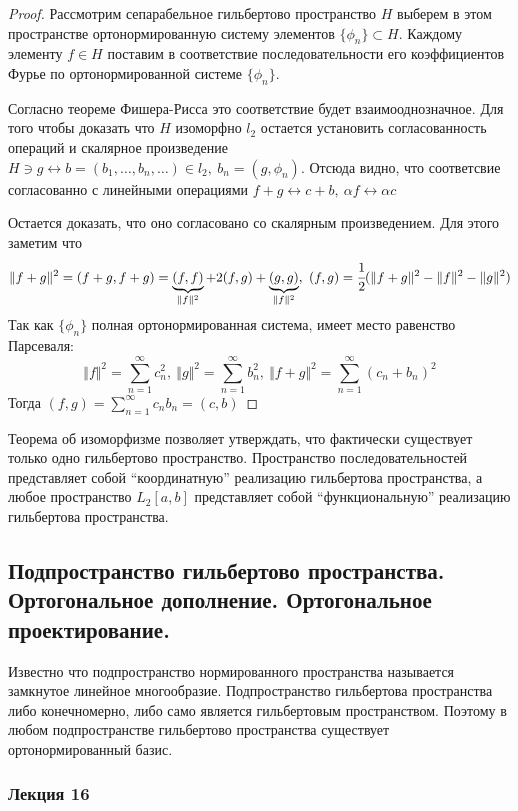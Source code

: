 \documentclass[14pt]{extarticle}
\theoremstyle{definition}
\theoremstyle{remark}
\renewcommand{\[}{\begin{dmath*}[compact]}
\renewcommand{\]}{\end{dmath*}}
\newcommand{\sep}{ , \ \allowbreak }
\begin{document}
\begin{proof}
  Рассмотрим сепарабельное гильбертово пространство $H$ выберем в этом
  пространстве ортонормированную систему элементов $\{\phi_n\} \subset H$.
  Каждому элементу $f \in H$ поставим в соответствие последовательности его
  коэффициентов Фурье по ортонормированной системе $\{\phi_n\}$.

  Согласно теореме Фишера-Рисса это соответствие будет взаимооднозначное.
  Для того чтобы доказать что $H$ изоморфно $l_2$ остается установить
  согласованность операций и скалярное произведение
  $H \ni g \leftrightarrow b = (b_1, \dots, b_n, \dots) \in l_2 \sep
  b_n= (g,\phi_n)$.
  Отсюда видно, что соответсвие согласованно с линейными операциями
  $f+g \leftrightarrow c+b \sep \alpha f \leftrightarrow \alpha c$

  Остается доказать, что оно согласовано со скалярным произведением.
  Для этого заметим что
  \[\Vert f+g \Vert ^ 2 = (f+g, f+g)
  = \underbrace{(f,f)}_{\Vert f \Vert^2} + 2(f,g)
    + \underbrace{(g,g)}_{\Vert f \Vert^2} \sep (f,g)
  = \cfrac{1}{2}(\Vert f+g \Vert ^2 - \Vert f \Vert^2 - \Vert g \Vert ^2)\]
  Так как $\{\phi_n\}$ полная ортонормированная система, имеет место
  равенство Парсеваля:
  \[\Vert f \Vert^2 = \sum_{n=1}^\infty c_n^2 \sep
  \Vert g \Vert^2 = \sum_{n=1}^\infty b_n^2 \sep
  \Vert f+g \Vert^2 = \sum_{n=1}^\infty(c_n+b_n)^2\]
  Тогда $(f,g) = \sum_{n=1}^\infty c_n b_n = (c,b)$
\end{proof}

Теорема об изоморфизме позволяет утверждать, что фактически существует только
одно гильбертово пространство. Пространство последовательностей представляет
собой ``координатную'' реализацию гильбертова пространства,
а любое пространство $L_2[a,b]$ представляет собой ``функциональную''
реализацию гильбертова пространства.

\subsection{Подпространство гильбертово пространства. Ортогональное дополнение.
Ортогональное проектирование.}

Известно что подпространство нормированного пространства называется
замкнутое линейное многообразие.
Подпространство гильбертова пространства либо конечномерно,
либо само является гильбертовым пространством.
Поэтому в любом подпространстве гильбертово пространства
существует ортонормированный базис.

\subsubsection{Лекция 16}
\end{document}
